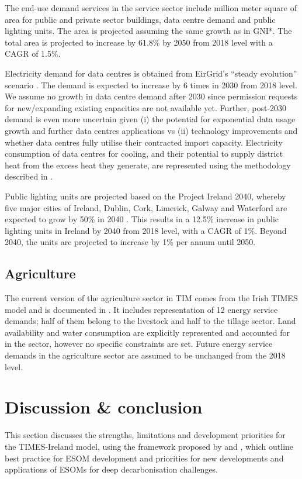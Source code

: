 \documentclass[gmd,manuscript]{copernicus}
\begin{document}
The end-use demand services in the service sector include million meter square of area for public and private sector buildings, data centre demand and public lighting units. The area is projected assuming the same growth as in GNI*. The total area is projected to increase by 61.8\% by 2050 from 2018 level with a CAGR of 1.5\%. 

Electricity demand for data centres is obtained from EirGrid's ``steady evolution'' scenario \citep{EirGridT57:online}. The demand is expected to increase by 6 times in 2030 from 2018 level. We assume no growth in data centre demand after 2030 since permission requests for new/expanding existing capacities are not available yet. Further, post-2030 demand is even more uncertain given (i) the potential for exponential data usage growth and further data centres applications vs (ii) technology improvements and whether data centres fully utilise their contracted import capacity. Electricity consumption of data centres for cooling, and their potential to supply district heat from the excess heat they generate, are represented using the methodology described in \citet{Petrovic2020}. 

Public lighting units are projected based on the Project Ireland 2040, whereby five major cities of Ireland, Dublin, Cork, Limerick, Galway and Waterford are expected to grow by 50\% in 2040 \citep{GovernmentofIreland2018}. This results in a 12.5\% increase in public lighting units in Ireland by 2040 from 2018 level, with a CAGR of 1\%. Beyond 2040, the units are projected to increase by 1\% per annum until 2050.

\subsection{Agriculture}
\label{ss:agriculture}
The current version of the agriculture sector in TIM comes from the Irish TIMES model and is documented in \citet{Chiodi2016}. It includes representation of 12 energy service demands; half of them belong to the livestock and half to the tillage sector. Land availability and water consumption are explicitly represented and accounted for in the sector, however no specific constraints are set. Future energy service demands in the agriculture sector are assumed to be unchanged from the 2018 level.

\section{Discussion \& conclusion}
\label{s:discussion}
This section discusses the strengths, limitations and development priorities for the TIMES-Ireland model, using the framework proposed by \citet{Pye2020} and \citet{DeCarolis2017}, which outline best practice for ESOM development and priorities for new developments and applications of ESOMs for deep decarbonisation challenges.
\end{document}
